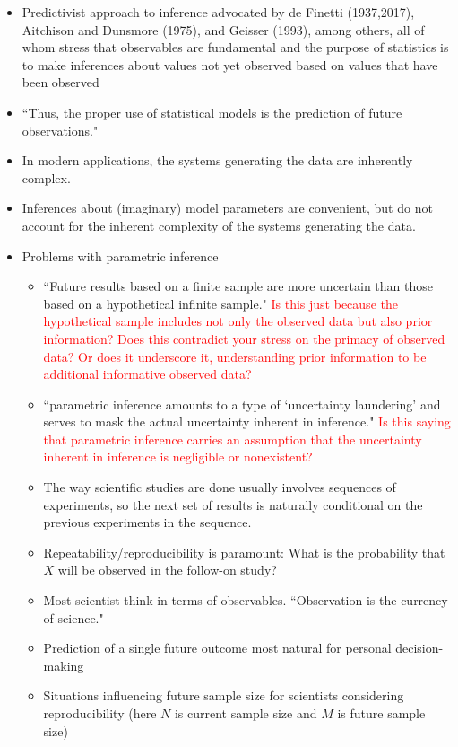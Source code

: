 \documentclass[12pt, a4paper]{article}
\begin{document}
\begin{itemize}
  \item Predictivist approach to inference advocated by de Finetti (1937,2017), Aitchison and Dunsmore (1975), and Geisser (1993), among others, all of whom stress that observables are fundamental and the purpose of statistics is to make inferences about values not yet observed based on values that have been observed
  \item ``Thus, the proper use of statistical models is the prediction of future observations."
  \item In modern applications, the systems generating the data are inherently complex.
  \item Inferences about (imaginary) model parameters are convenient, but do not account for the inherent complexity of the systems generating the data.
  \item Problems with parametric inference
  \begin{itemize}
    \item ``Future results based on a finite sample are more uncertain than those based on a hypothetical infinite sample." \textcolor{red}{Is this just because the hypothetical sample includes not only the observed data but also prior information?  Does this contradict your stress on the primacy of observed data?  Or does it underscore it, understanding prior information to be additional informative observed data?}
    \item ``parametric inference amounts to a type of `uncertainty laundering' and serves to mask the actual uncertainty inherent in inference."  \textcolor{red}{Is this saying that parametric inference carries an assumption that the uncertainty inherent in inference is negligible or nonexistent?}
    \item The way scientific studies are done usually involves sequences of experiments, so the next set of results is naturally conditional on the previous experiments in the sequence.
    \item Repeatability/reproducibility is paramount:  What is the probability that $X$ will be observed in the follow-on study?
    \item Most scientist think in terms of observables.  ``Observation is the currency of science."
  \end{itemize}
  \begin{itemize}
    \item Prediction of a single future outcome most natural for personal decision-making
    \item Situations influencing future sample size for scientists considering reproducibility (here $N$ is current sample size and $M$ is future sample size)

\end{itemize}
\end{itemize}
\end{document}
